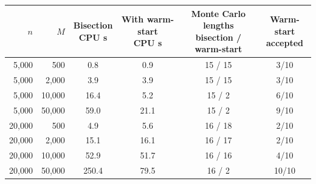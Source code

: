 \begin{tabular}{rrcccc}
\toprule
$n$ & $M$ & \makecell{Bisection\\CPU s} & \makecell{With warm-start\\CPU s} & \makecell{Monte Carlo lengths\\bisection / warm-start} & \makecell{Warm-start\\accepted} \\
\midrule
5,000 & 500 & 0.8 & 0.9 & 15 / 15 & 3/10 \\
5,000 & 2,000 & 3.9 & 3.9 & 15 / 15 & 3/10 \\
5,000 & 10,000 & 16.4 & 5.2 & 15 / 2 & 6/10 \\
5,000 & 50,000 & 59.0 & 21.1 & 15 / 2 & 9/10 \\
20,000 & 500 & 4.9 & 5.6 & 16 / 18 & 2/10 \\
20,000 & 2,000 & 15.1 & 16.1 & 16 / 17 & 2/10 \\
20,000 & 10,000 & 52.9 & 51.7 & 16 / 16 & 4/10 \\
20,000 & 50,000 & 250.4 & 79.5 & 16 / 2 & 10/10 \\
\bottomrule
\end{tabular}
